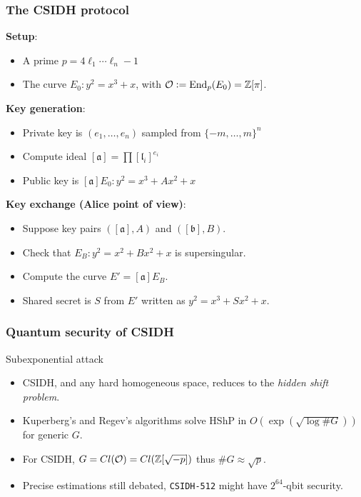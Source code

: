 \documentclass{beamer}
\begin{document}
    \begin{frame}
        \frametitle{The CSIDH protocol}
        
        \begin{block}{}
            \textbf{Setup}: 
            \begin{itemize}
                \item A prime $p=4\ell_1\cdots\ell_n-1$
                \item The curve $E_0:y^2=x^3+x$, with $\mathcal{O}:=\operatorname{End}_p(E_0)=\mathbb{Z}[\pi]$.
            \end{itemize}
            
            \textbf{Key generation}:
            \begin{itemize}
                \item Private key is $(e_1,\dots,e_n)$ sampled from $\{ -m,\dots,m \}^n$
                \item Compute ideal $[\mathfrak{a}] = \prod [\mathfrak{l}_i]^{e_i}$
                \item Public key is $[\mathfrak{a}]E_0:y^2=x^3+Ax^2+x$
            \end{itemize}
            
            \textbf{Key exchange (Alice point of view)}: 
            \begin{itemize}
                \item Suppose key pairs $([\mathfrak{a}], A)$ and $([\mathfrak{b}], B)$.
                \item Check that $E_B:y^2=x^2+Bx^2+x$ is supersingular.
                \item Compute the curve $E'=[\mathfrak{a}]E_B$.
                \item Shared secret is $S$ from $E'$ written as $y^2=x^3+Sx^2+x$.
            \end{itemize}
        \end{block}
    
    \end{frame}

    \begin{frame}
        \frametitle{Quantum security of CSIDH}
        
        \begin{block}{Subexponential attack}
            \begin{itemize}
                \item CSIDH, and any hard homogeneous space, reduces to the \emph{hidden shift problem}.
                \item Kuperberg's and Regev's algorithms solve HShP in $O(\exp(\sqrt{\log \# G}))$ for generic $G$.
                \item For CSIDH, $G=Cl(\mathcal{O})=Cl(\mathbb{Z}[\sqrt{-p}])$ thus $\# G\approx\sqrt{p}$.
                \item Precise estimations still debated, \texttt{CSIDH-512} might have $2^{64}$-qbit security.
            \end{itemize}
        \end{block}
    
    \end{frame}
    
\end{document}

